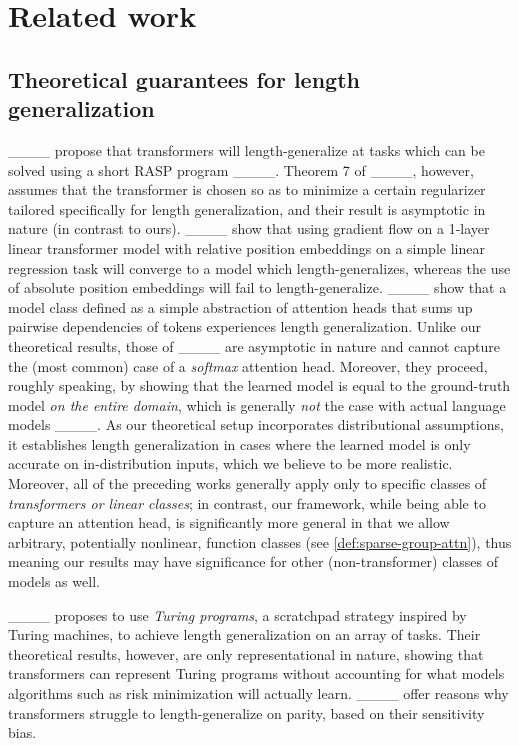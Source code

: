 \section{Related work}
\label{sec:related-work}

\subsection{Theoretical guarantees for length generalization}
____
propose that transformers will length-generalize at tasks which can be solved using a short RASP program ____. Theorem 7 of ____, however, assumes that the transformer is chosen so as to minimize a certain regularizer tailored specifically for length generalization, and their result is asymptotic in nature (in contrast to ours).
____ show that using  gradient flow on a 1-layer linear transformer model with relative position embeddings on a simple linear regression task will converge to a model which length-generalizes, whereas the use of absolute position embeddings will fail to length-generalize. ____ show that a model class defined as a simple abstraction of attention heads that sums up pairwise dependencies of tokens experiences length generalization. %
Unlike our theoretical results, those of   ____ are asymptotic in nature and cannot capture the (most common) case of a \emph{softmax} attention head. Moreover, they proceed, roughly speaking, by showing that the learned model is equal to the ground-truth model \emph{on the entire domain}, which is generally \emph{not} the case with actual language models ____. As our theoretical setup incorporates distributional assumptions, it establishes length generalization in cases where the learned model is only accurate on in-distribution inputs, which we believe to be more realistic.
Moreover, all of the preceding works generally apply only to specific classes of \emph{transformers or linear classes}; in contrast, our framework, while being able to capture an attention head, is significantly more general in that we allow arbitrary, potentially nonlinear, function classes (see \cref{def:sparse-group-attn}), thus meaning our results may have significance for other (non-transformer) classes of models as well. 

____ proposes to use \emph{Turing programs}, a scratchpad strategy inspired by Turing machines, to achieve length generalization on an array of tasks. Their  theoretical results, however, are only representational in nature, showing that transformers can represent Turing programs without  accounting for what models algorithms such as risk minimization will actually learn. ____ offer reasons why transformers struggle to length-generalize on parity, based on their sensitivity bias. 


